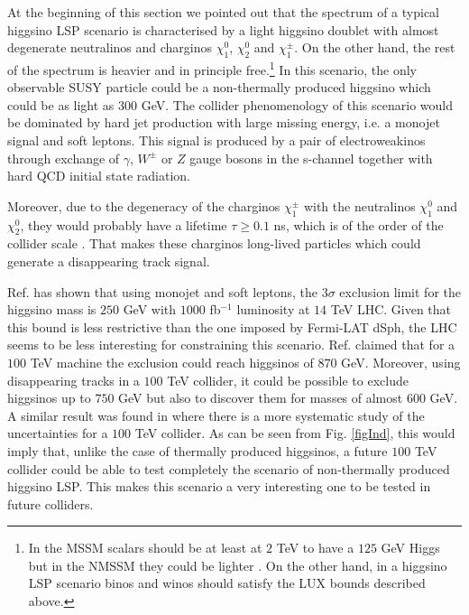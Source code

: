 \documentclass[11pt,a4paper]{article}
\begin{document}
At the beginning of this section we pointed out that the spectrum of a typical higgsino LSP scenario is characterised by a light higgsino doublet with almost degenerate neutralinos and charginos $\chi_1^0$, $\chi_2^0$ and $\chi_1^\pm$. On the other hand, the rest of the spectrum is heavier and in principle free.\footnote{In the MSSM scalars should be at least at $2$ TeV to have a $125$ GeV Higgs \cite{Vega:2015fna} but in the NMSSM they could be lighter \cite{Hall:2011aa}. On the other hand, in a higgsino LSP scenario binos and winos should satisfy the LUX bounds described above.} In this scenario, the only observable SUSY particle could be a non-thermally produced higgsino which could be as light as $300$ GeV. The collider phenomenology of this scenario would be dominated by hard jet production with large missing energy, i.e. a monojet signal and soft leptons. This signal is produced by a pair of electroweakinos through exchange of $\gamma$, $W^\pm$ or $Z$ gauge bosons in the s-channel together with hard QCD initial state radiation.

Moreover, due to the degeneracy of the charginos $\chi_1^\pm$ with the neutralinos $\chi_1^0$ and $\chi_2^0$, they would probably have a lifetime $\tau\geq0.1$ ns, which is of the order of the collider scale \cite{Low:2014cba}. That makes these charginos long-lived particles which could generate a disappearing track signal.

Ref. \cite{Baer:2014kya} has shown that using monojet and soft leptons, the 3$\sigma$ exclusion limit for the higgsino mass is $250$ GeV with $1000$ fb$^{-1}$ luminosity at $14$ TeV LHC. Given that this bound is less restrictive than the one imposed by Fermi-LAT dSph, the LHC seems to be less interesting for constraining this scenario. Ref. \cite{Low:2014cba} claimed that for a $100$ TeV machine the exclusion could reach higgsinos of $870$ GeV. Moreover, using disappearing tracks in a $100$ TeV collider, it could be possible to exclude higgsinos up to $750$ GeV but also to discover them for masses of almost $600$ GeV. A similar result was found in \cite{Ismail:2016zby} where there is a more systematic study of the uncertainties for a $100$ TeV collider. As can be seen from Fig. \ref{figInd}, this would imply that, unlike the case of thermally produced higgsinos, a future $100$ TeV collider could be able to test completely the scenario of non-thermally produced higgsino LSP. This makes this scenario a very interesting one to be tested in future colliders.
\end{document}
